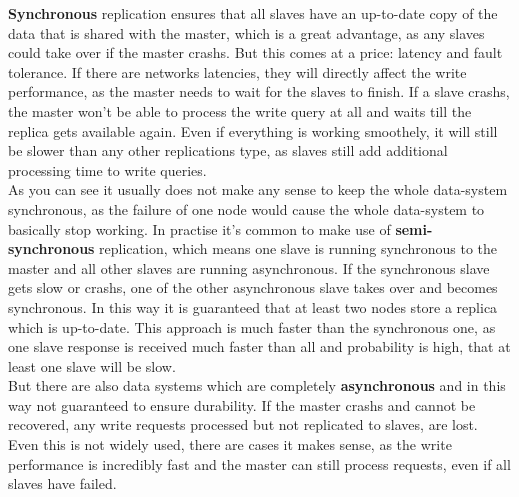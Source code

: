 {\textbf{Synchronous} replication ensures that all slaves have an up-to-date copy of the data that is shared with the master, which is a great advantage, as any slaves could take over if the master crashs. But this comes at a price: latency and fault tolerance. If there are networks latencies, they will directly affect the write performance, as the master needs to wait for the slaves to finish. If a slave crashs, the master won't be able to process the write query at all and waits till the replica gets available again. Even if everything is working smoothely, it will still be slower than any other replications type, as slaves still add additional processing time to write queries.\\
As you can see it usually does not make any sense to keep the whole data-system synchronous, as the failure of one node would cause the whole data-system to basically stop working. In practise it's common to make use of \textbf{semi-synchronous} replication, which means one slave is running synchronous to the master and all other slaves are running asynchronous. If the synchronous slave gets slow or crashs, one of the other asynchronous slave takes over and becomes synchronous. In this way it is guaranteed that at least two nodes store a replica which is up-to-date. This approach is much faster than the synchronous one, as one slave response is received much faster than all and probability is high, that at least one slave will be slow.\\
But there are also data systems which are completely \textbf{asynchronous} and in this way not guaranteed to ensure durability. If the master crashs and cannot be recovered, any write requests processed but not replicated to slaves, are lost. Even this is not widely used, there are cases it makes sense, as the write performance is incredibly fast and the master can still process requests, even if all slaves have failed.\\

}
